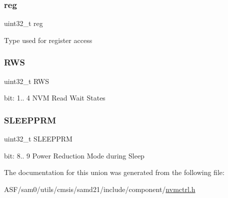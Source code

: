 \subsubsection{\texorpdfstring{reg}{reg}}
{\footnotesize\ttfamily uint32\+\_\+t reg}

Type used for register access \mbox{\label{union_n_v_m_c_t_r_l___c_t_r_l_b___type_ae44f50b4b530927bd49372b49e2d7a6c}} 
\subsubsection{\texorpdfstring{RWS}{RWS}}
{\footnotesize\ttfamily uint32\+\_\+t R\+WS}

bit\+: 1.. 4 N\+VM Read Wait States \mbox{\label{union_n_v_m_c_t_r_l___c_t_r_l_b___type_a40131bb8314257159c8df97f360d0e41}} 
\subsubsection{\texorpdfstring{SLEEPPRM}{SLEEPPRM}}
{\footnotesize\ttfamily uint32\+\_\+t S\+L\+E\+E\+P\+P\+RM}

bit\+: 8.. 9 Power Reduction Mode during Sleep 

The documentation for this union was generated from the following file\+:\begin{DoxyCompactItemize}
\item 
A\+S\+F/sam0/utils/cmsis/samd21/include/component/\mbox{\hyperlink{component_2nvmctrl_8h}{nvmctrl.\+h}}\end{DoxyCompactItemize}
